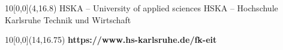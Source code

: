 \begin{titlepage}
\vspace{1cm}

\begin{center}
\end{center}

\vspace{2cm}
\begin{center}
\large{\timeandplace}
\end{center}


\begin{textblock}{10}[0,0](4,16.8)
\tiny{
		{HSKA -- University of applied sciences}
		{HSKA -- Hochschule Karlsruhe Technik und Wirtschaft}
}
\end{textblock}

\begin{textblock}{10}[0,0](14,16.75)
\tiny{
	\textbf{https://www.hs-karlsruhe.de/fk-eit}
}
\end{textblock}

\end{titlepage}
